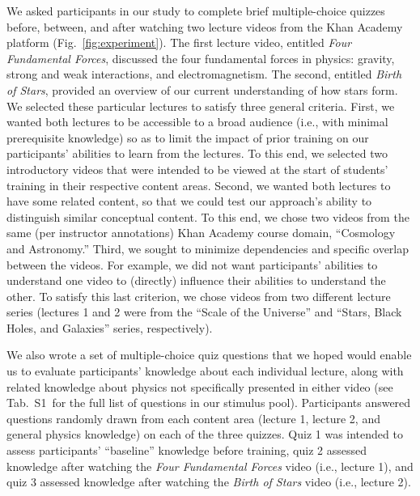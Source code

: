 \documentclass[10pt]{article}
\newcommand{\questions}{S1}
\begin{document}
We asked participants in our study to complete brief multiple-choice quizzes
before, between, and after watching two lecture videos from the Khan
Academy~\citep{Khan04} platform (Fig.~\ref{fig:experiment}). The first lecture
video, entitled \textit{Four Fundamental Forces}, discussed the four
fundamental forces in physics: gravity, strong and weak interactions, and
electromagnetism. The second, entitled \textit{Birth of Stars}, provided an
overview of our current understanding of how stars form. We selected these
particular lectures to satisfy three general criteria. First, we wanted both
lectures to be accessible to a broad audience (i.e., with minimal prerequisite
knowledge) so as to limit the impact of prior training on our participants'
abilities to learn from the lectures. To this end, we selected two introductory
videos that were intended to be viewed at the start of students' training in
their respective content areas. Second, we wanted both lectures to have some
related content, so that we could test our approach's ability to distinguish
similar conceptual content. To this end, we chose two videos from the same (per
instructor annotations) Khan Academy course domain, ``Cosmology and
Astronomy.'' Third, we sought to minimize dependencies and specific overlap
between the videos. For example, we did not want participants' abilities to
understand one video to (directly) influence their abilities to understand the
other. To satisfy this last criterion, we chose videos from two different
lecture series (lectures 1 and 2 were from the ``Scale of the Universe'' and
``Stars, Black Holes, and Galaxies'' series, respectively).

We also wrote a set of multiple-choice quiz questions that we hoped would
enable us to evaluate participants' knowledge about each individual lecture,
along with related knowledge about physics not specifically presented in either
video (see Tab.~\questions~for the full list of questions in our stimulus
pool). Participants answered questions randomly drawn from each content area
(lecture 1, lecture 2, and general physics knowledge) on each of the three
quizzes. Quiz 1 was intended to assess participants' ``baseline'' knowledge
before training, quiz 2 assessed knowledge after watching the \textit{Four
Fundamental Forces} video (i.e., lecture 1), and quiz 3 assessed knowledge
after watching the \textit{Birth of Stars} video (i.e., lecture 2).
\end{document}
